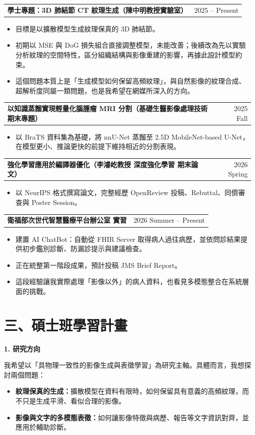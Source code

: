 \documentclass[11pt]{article}
\makeatletter
\newcommand{\entry}[2]{%
  \par\noindent
  \begin{tabularx}{\textwidth}{@{}X r@{}}
    \textbf{#1} & #2
  \end{tabularx}\par}
\makeatother
\begin{document}
\entry{學士專題：3D 肺結節 CT 紋理生成（陳中明教授實驗室）}{2025 -- Present}
\begin{itemize}
  \item 目標是以擴散模型生成紋理保真的 3D 肺結節。
  \item 初期以 MSE 與 DoG 損失組合直接調整模型，未能改善；後續改為先以實驗分析紋理的空間特性，區分組織結構與影像重建的影響，再據此設計模型約束。
  \item 這個問題本質上是「生成模型如何保留高頻紋理」，與自然影像的紋理合成、超解析度同屬一類問題，也是我希望在網媒所深入的方向。
\end{itemize}

\entry{以知識蒸餾實現輕量化腦腫瘤 MRI 分割（基礎生醫影像處理技術 期末專題）}{2025 Fall}
\begin{itemize}
  \item 以 BraTS 資料集為基礎，將 nnU-Net 蒸餾至 2.5D MobileNet-based U-Net，在模型更小、推論更快的前提下維持相近的分割表現。
\end{itemize}

\entry{強化學習應用於編譯器優化（李濬屹教授 深度強化學習 期末論文）}{2026 Spring}
\begin{itemize}
  \item 以 NeurIPS 格式撰寫論文，完整經歷 OpenReview 投稿、Rebuttal、同儕審查與 Poster Session。
\end{itemize}

\entry{衛福部次世代智慧醫療平台辦公室 實習}{2026 Summer -- Present}
\begin{itemize}
  \item 建置 AI ChatBot：自動從 FHIR Server 取得病人過往病歷，並依問診結果提供初步鑑別診斷、防漏診提示與建議檢查。
  \item 正在統整第一階段成果，預計投稿 JMS Brief Report。
  \item 這段經驗讓我實際處理「影像以外」的病人資料，也看見多模態整合在系統層面的挑戰。
\end{itemize}

\section*{三、碩士班學習計畫}

\noindent\textbf{1. 研究方向}

我希望以「具物理一致性的影像生成與表徵學習」為研究主軸。具體而言，我想探討兩個問題：
\begin{itemize}
  \item \textbf{紋理保真的生成：}擴散模型在資料有限時，如何保留具有意義的高頻紋理，而不只是生成平滑、看似合理的影像。
  \item \textbf{影像與文字的多模態表徵：}如何讓影像特徵與病歷、報告等文字資訊對齊，並應用於輔助診斷。
\end{itemize}
\end{document}
